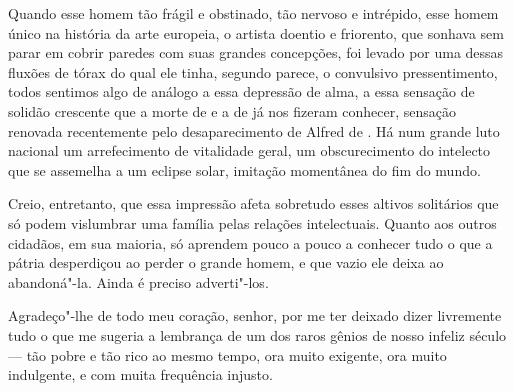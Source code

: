 Quando esse homem tão frágil e obstinado, tão nervoso e intrépido, esse
homem único na história da arte europeia, o artista doentio e
friorento, que sonhava sem parar em cobrir paredes com suas grandes
concepções, foi levado por uma dessas fluxões de tórax do qual ele
tinha, segundo parece, o convulsivo pressentimento, todos sentimos algo
de análogo a essa depressão de alma, a essa sensação de solidão
crescente que a morte de  e a de  já nos fizeram
conhecer, sensação renovada recentemente pelo desaparecimento de Alfred
de . Há num grande luto nacional um arrefecimento de vitalidade
geral, um obscurecimento do intelecto que se assemelha a um eclipse
solar, imitação momentânea do fim do mundo.

\EP[-2]
Creio, entretanto, que essa impressão afeta sobretudo esses altivos
solitários que só podem vislumbrar uma família pelas relações
intelectuais. Quanto aos outros cidadãos, em sua maioria, só aprendem
pouco a pouco a conhecer tudo o que a pátria desperdiçou ao perder o
grande homem, e que vazio ele deixa ao abandoná"-la. Ainda é preciso
adverti"-los.

Agradeço"-lhe de todo meu coração, senhor, por me ter deixado dizer
livremente tudo o que me sugeria a lembrança de um dos raros gênios de
nosso infeliz século --- tão pobre e tão rico ao mesmo tempo, ora muito
exigente, ora muito indulgente, e com muita frequência injusto.
